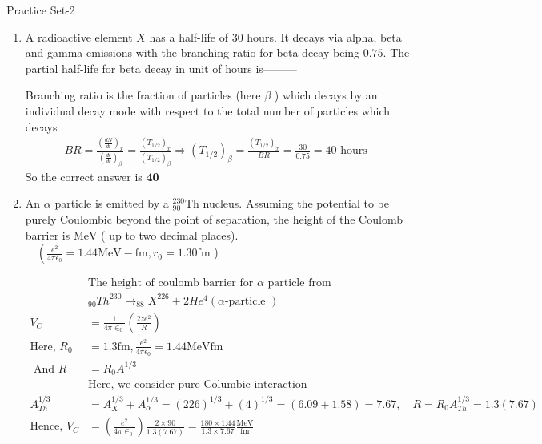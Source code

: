 \newpage
\begin{abox}
	Practice Set-2
\end{abox}
\begin{enumerate}
	\item A radioactive element $X$ has a half-life of 30 hours. It decays via alpha, beta and gamma emissions with the branching ratio for beta decay being $0.75$. The partial half-life for beta decay in unit of hours is---------
	{}
	\begin{answer}
		Branching ratio is the fraction of particles (here $\beta$ ) which decays by an individual decay mode with respect to the total number of particles which decays
		\begin{align*}
		B R=\frac{\left(\frac{d N}{d t}\right)_x}{\left(\frac{d t}{d t}\right)_\beta}=\frac{\left(T_{1 / 2}\right)_x}{\left(T_{1 / 2}\right)_\beta} \Rightarrow\left(T_{1 / 2}\right)_\beta=\frac{\left(T_{1 / 2}\right)_x}{B R}=\frac{30}{0.75}=40 \text { hours }
		\end{align*}
		So the correct answer is \textbf{40}
	\end{answer}
	\item An $\alpha$ particle is emitted by a ${ }_{90}^{230} \mathrm{Th}$ nucleus. Assuming the potential to be purely Coulombic beyond the point of separation, the height of the Coulomb barrier is
	$\mathrm{MeV}$ ( up to two decimal places). $\quad\left(\frac{e^2}{4 \pi \epsilon_0}=1.44 \mathrm{MeV}-\mathrm{fm}, r_0=1.30 \mathrm{fm}\right.$ )
	{}
	\begin{answer}
		\begin{align*}
		&\text{The height of coulomb barrier for $\alpha$ particle from}\\
		&{ }_{90} T h^{230} \rightarrow_{88} X^{226}+2 H e^4(\alpha \text {-particle }) \\
		V_C&=\frac{1}{4 \pi \in_0}\left(\frac{2 z e^2}{R}\right)\\
		\text{Here, }R_0&=1.3 \mathrm{fm}, \frac{e^2}{4 \pi \epsilon_0}=1.44 \mathrm{MeV} \mathrm{fm}\\
		\text{	And }R&=R_0 A^{1 / 3}\\
		&\text{Here, we consider pure Columbic interaction}\\
		A_{T h}^{1 / 3}&=A_X^{1 / 3}+A_\alpha^{1 / 3}=(226)^{1 / 3}+(4)^{1 / 3}=(6.09+1.58)=7.67, \quad R=R_0 A_{T h}^{1 / 3}=1.3(7.67)\\
		\text{Hence, }V_C&=\left(\frac{e^2}{4 \pi \in_0}\right) \frac{2 \times 90}{1.3(7.67)}=\frac{180 \times 1.44}{1.3 \times 7.67} \frac{\mathrm{MeV}}{\mathrm{fm}}\\

\end{align*}
\end{answer}
\end{enumerate}
